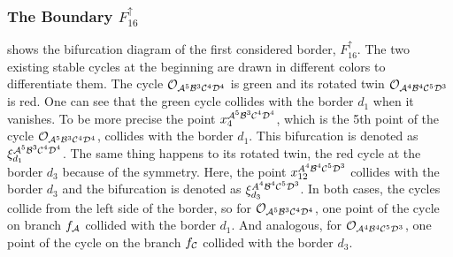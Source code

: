 

\subsubsection{The Boundary $F_{16}^\uparrow$}

 shows the bifurcation diagram of the first considered border, $F_{16}^\uparrow$.
The two existing stable cycles at the beginning are drawn in different colors to differentiate them.
The cycle $\mathcal{O}_{\mathcal{A}^5\mathcal{B}^3\mathcal{C}^4\mathcal{D}^4}$ is green and its rotated twin $\mathcal{O}_{\mathcal{A}^4\mathcal{B}^4\mathcal{C}^5\mathcal{D}^3}$ is red.
One can see that the green cycle collides with the border $d_1$ when it vanishes.
To be more precise the point $x_4^{\mathcal{A}^5\mathcal{B}^3\mathcal{C}^4\mathcal{D}^4}$, which is the 5th point of the cycle $\mathcal{O}_{\mathcal{A}^5\mathcal{B}^3\mathcal{C}^4\mathcal{D}^4}$, collides with the border $d_1$.
This bifurcation is denoted as $\xi_{d_1}^{\mathcal{A}^5\mathcal{B}^3\mathcal{C}^4\mathcal{D}^4}$.
The same thing happens to its rotated twin, the red cycle at the border $d_3$ because of the symmetry.
Here, the point $x_{12}^{A^4\mathcal{B}^4\mathcal{C}^5\mathcal{D}^3}$ collides with the border $d_3$ and the bifurcation is denoted as $\xi_{d_3}^{A^4\mathcal{B}^4\mathcal{C}^5\mathcal{D}^3}$.
In both cases, the cycles collide from the left side of the border, so for $\mathcal{O}_{\mathcal{A}^5\mathcal{B}^3\mathcal{C}^4\mathcal{D}^4}$, one point of the cycle on branch $f_{\mathcal{A}}$ collided with the border $d_1$.
And analogous, for $\mathcal{O}_{\mathcal{A}^4\mathcal{B}^4\mathcal{C}^5\mathcal{D}^3}$, one point of the cycle on the branch $f_{\mathcal{C}}$ collided with the border $d_3$.

